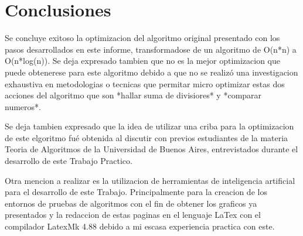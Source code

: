 \section{Conclusiones}

Se concluye exitoso la optimizacion del algoritmo original presentado con los pasos desarrollados en este informe, transformadose de un algoritmo de O(n*n) a O(n*log(n)). Se
deja expresado tambien que no es la mejor optimizacion que puede obtenerese para este algoritmo debido a que no se realizó una investigacion exhaustiva en metodologias 
 o tecnicas que permitar micro optimizar estas dos acciones del algoritmo que son *hallar suma de divisiores* y *comparar numeros*. 

Se deja tambien expresado que la idea de utilizar una criba para la optimizacion de este elgoritmo fué obtenida al discutir con previos estudiantes de la materia Teoria de 
Algoritmos de la Universidad de Buenos Aires, entrevistados durante el desarrollo de este Trabajo Practico.

Otra mencion a realizar es la utilizacion de herramientas de inteligencia artificial para el desarrollo de este Trabajo. Principalmente para la creacion de los entornos de 
pruebas de algoritmos con el fin de obtener los graficos ya presentados y la redaccion de estas paginas en el lenguaje LaTex con el compilador LatexMk 4.88 debido a mi escasa
experiencia practica con este. 


